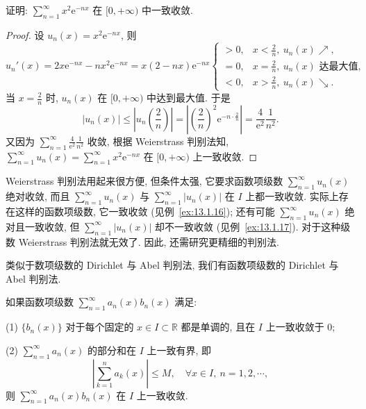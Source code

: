 \begin{example}\label{ex:13.1.15}
证明: $\sum_{n=1}^{\infty}x^{2}\mathrm{e}^{-nx}$ 在 $[0,+\infty)$ 中一致收敛.
\end{example}

\begin{proof}
设 $u_{n}(x)=x^{2}\mathrm{e}^{-nx}$, 则
\[
  u_{n}'(x)=2x\mathrm{e}^{-nx}-nx^{2}\mathrm{e}^{-nx}=x(2-nx)\mathrm{e}^{-nx}\begin{cases}
    >0, & x<\frac{2}{n},\ u_{n}(x)\nearrow,\\
    =0, & x=\frac{2}{n},\ u_{n}(x)\text{ 达最大值},\\
    <0, & x>\frac{2}{n},\ u_{n}(x)\searrow.
\end{cases}
\]
当 $x=\frac{2}{n}$ 时, $u_{n}(x)$ 在 $[0,+\infty)$ 中达到最大值. 于是
\[
  |u_{n}(x)|\leqslant\left|u_{n}\left(\frac{2}{n}\right)\right|=\left|\left(\frac{2}{n}\right)^{2}\mathrm{e}^{-n\cdot\frac{2}{n}}\right|=\frac{4}{\mathrm{e}^{2}}\frac{1}{n^{2}}.
\]
又因为 $\sum_{n=1}^{\infty}\frac{4}{\mathrm{e}^{2}}\frac{1}{n^{2}}$ 收敛, 根据 Weierstrass 判别法知, $\sum_{n=1}^{\infty}u_{n}(x)=\sum_{n=1}^{\infty}x^{2}\mathrm{e}^{-nx}$ 在 $[0,+\infty)$ 上一致收敛.
\end{proof}

Weierstrass 判别法用起来很方便, 但条件太强, 它要求函数项级数 $\sum_{n=1}^{\infty}u_{n}(x)$ 绝对收敛, 而且 $\sum_{n=1}^{\infty}u_{n}(x)$ 与 $\sum_{n=1}^{\infty}|u_{n}(x)|$ 在 $I$ 上都一致收敛. 实际上存在这样的函数项级数, 它一致收敛 (见例~\ref{ex:13.1.16}); 还有可能 $\sum_{n=1}^{\infty}u_{n}(x)$ 绝对且一致收敛, 但 $\sum_{n=1}^{\infty}|u_{n}(x)|$ 却不一致收敛 (见例~\ref{ex:13.1.17}). 对于这种级数 Weierstrass 判别法就无效了. 因此, 还需研究更精细的判别法.

类似于数项级数的 Dirichlet 与 Abel 判别法, 我们有函数项级数的 Dirichlet 与 Abel 判别法.

\begin{theorem}\label{thm:13.1.4}
如果函数项级数 $\sum_{n=1}^{\infty}a_{n}(x)b_{n}(x)$ 满足:

(1) $\{b_{n}(x)\}$ 对于每个固定的 $x\in I\subset\mathbb{R}$ 都是单调的, 且在 $I$ 上一致收敛于 $0$;

(2) $\sum_{n=1}^{\infty}a_{n}(x)$ 的部分和在 $I$ 上一致有界, 即
\[
  \left|\sum_{k=1}^{n}a_{k}(x)\right|\leqslant M,\quad\forall x\in I,\ n=1,2,\cdots,
\]
则 $\sum_{n=1}^{\infty}a_{n}(x)b_{n}(x)$ 在 $I$ 上一致收敛.
\end{theorem}


